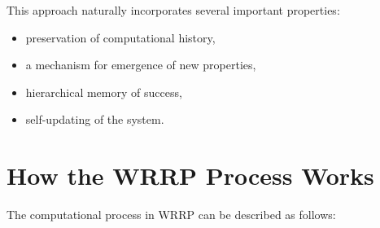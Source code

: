 \documentclass[11pt,a4paper]{article}
\begin{document}
This approach naturally incorporates several important properties:
\begin{itemize}[leftmargin=*]
    \item preservation of computational history,
    \item a mechanism for emergence of new properties,
    \item hierarchical memory of success,
    \item self-updating of the system.
\end{itemize}

\section{How the WRRP Process Works}

The computational process in WRRP can be described as follows:
\end{document}
